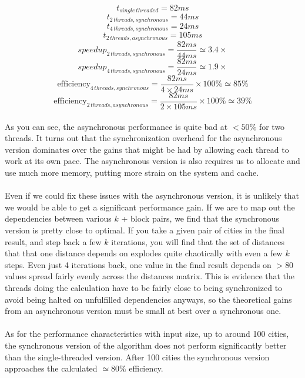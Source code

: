 \documentclass[12pt]{article}
\begin{document}
	$$t_{single\,threaded} = 82ms$$
	$$t_{2\,threads, synchronous} = 44ms$$
	$$t_{4\,threads, synchronous} = 24ms$$
	$$t_{2\,threads, asynchronous} = 105ms$$
	$$speedup_{2\,threads, synchronous} = \dfrac{82ms}{44ms} \simeq 3.4\times$$
	$$speedup_{4\,threads, synchronous} = \dfrac{82ms}{24ms} \simeq 1.9\times$$
	$$\text{efficiency}_{4\,threads, synchronous} = \dfrac{82ms}{4\times24ms}\times 100\% \simeq 85\% $$
	$$\text{efficiency}_{2\,threads, asynchronous} = \dfrac{82ms}{2\times105ms}\times 100\% \simeq 39\% $$
	
	\paragraph{}
	As you can see, the asynchronous performance is quite bad at $<50\%$ for two threads. It turns out that the synchronization overhead for the asynchronous version dominates over the gains that might be had by allowing each thread to work at its own pace. The asynchronous version is also requires us to allocate and use much more memory, putting more strain on the system and cache.
	
	\paragraph{}
	Even if we could fix these issues with the asynchronous version, it is unlikely that we would be able to get a significant performance gain. If we are to map out the dependencies between various $k$ + block pairs, we find that the synchronous version is pretty close to optimal. If you take a given pair of cities in the final result, and step back a few $k$ iterations, you will find that the set of distances that that one distance depends on explodes quite chaotically with even a few $k$ steps. Even just 4 iterations back, one value in the final result depends on $>80$ values spread fairly evenly across the distances matrix. This is evidence that the threads doing the calculation have to be fairly close to being synchronized to avoid being halted on unfulfilled dependencies anyways, so the theoretical gains from an asynchronous version must be small at best over a synchronous one.
	
	\paragraph{}
	As for the performance characteristics with input size, up to around 100 cities, the synchronous version of the algorithm does not perform significantly better than the single-threaded version. After 100 cities the synchronous version approaches the calculated $\simeq 80\%$ efficiency.
	
\end{document}
